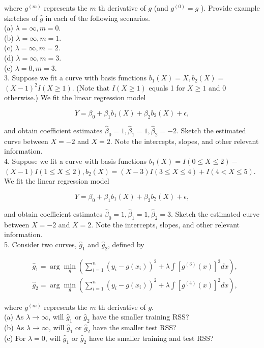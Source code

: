 \documentclass[10pt]{article}
\begin{document}
where $g^{(m)}$ represents the $m$ th derivative of $g$ (and $g^{(0)}=g$ ). Provide example sketches of $\hat{g}$ in each of the following scenarios.\\
(a) $\lambda=\infty, m=0$.\\
(b) $\lambda=\infty, m=1$.\\
(c) $\lambda=\infty, m=2$.\\
(d) $\lambda=\infty, m=3$.\\
(e) $\lambda=0, m=3$.\\
3. Suppose we fit a curve with basis functions $b_{1}(X)=X, b_{2}(X)=$ $(X-1)^{2} I(X \geq 1)$. (Note that $I(X \geq 1)$ equals 1 for $X \geq 1$ and 0 otherwise.) We fit the linear regression model

$$
Y=\beta_{0}+\beta_{1} b_{1}(X)+\beta_{2} b_{2}(X)+\epsilon,
$$

and obtain coefficient estimates $\hat{\beta}_{0}=1, \hat{\beta}_{1}=1, \hat{\beta}_{2}=-2$. Sketch the estimated curve between $X=-2$ and $X=2$. Note the intercepts, slopes, and other relevant information.\\
4. Suppose we fit a curve with basis functions $b_{1}(X)=I(0 \leq X \leq 2)-$ $(X-1) I(1 \leq X \leq 2), b_{2}(X)=(X-3) I(3 \leq X \leq 4)+I(4<X \leq 5)$. We fit the linear regression model

$$
Y=\beta_{0}+\beta_{1} b_{1}(X)+\beta_{2} b_{2}(X)+\epsilon,
$$

and obtain coefficient estimates $\hat{\beta}_{0}=1, \hat{\beta}_{1}=1, \hat{\beta}_{2}=3$. Sketch the estimated curve between $X=-2$ and $X=2$. Note the intercepts, slopes, and other relevant information.\\
5. Consider two curves, $\hat{g}_{1}$ and $\hat{g}_{2}$, defined by

$$
\begin{aligned}
& \hat{g}_{1}=\arg \min _{g}\left(\sum_{i=1}^{n}\left(y_{i}-g\left(x_{i}\right)\right)^{2}+\lambda \int\left[g^{(3)}(x)\right]^{2} d x\right), \\
& \hat{g}_{2}=\arg \min _{g}\left(\sum_{i=1}^{n}\left(y_{i}-g\left(x_{i}\right)\right)^{2}+\lambda \int\left[g^{(4)}(x)\right]^{2} d x\right),
\end{aligned}
$$

where $g^{(m)}$ represents the $m$ th derivative of $g$.\\
(a) As $\lambda \rightarrow \infty$, will $\hat{g}_{1}$ or $\hat{g}_{2}$ have the smaller training RSS?\\
(b) As $\lambda \rightarrow \infty$, will $\hat{g}_{1}$ or $\hat{g}_{2}$ have the smaller test RSS?\\
(c) For $\lambda=0$, will $\hat{g}_{1}$ or $\hat{g}_{2}$ have the smaller training and test RSS?
\end{document}
